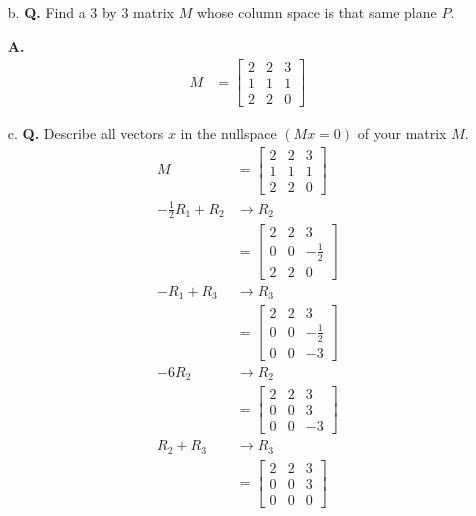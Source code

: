 \documentclass[main.tex]{subfiles}
\begin{document}
\begin{enumerate}
\begin{enumerate}
    \item [b.] \textbf{Q.} Find a 3 by 3 matrix $M$ whose column space is that same plane $P$. 
    
    \textbf{A.}
    $$
    \begin{aligned}
    M & = \left[\begin{array}{lll}
    2 & 2 & 3 \\
    1 & 1 & 1 \\
    2 & 2 & 0
    \end{array}\right]
    \end{aligned}
    $$
    
    \item [c.] \textbf{Q.} Describe all vectors $x$ in the nullspace $(M x=0)$ of your matrix $M$. 
    $$
    \begin{aligned}
    M & = \left[\begin{array}{lll}
    2 & 2 & 3 \\
    1 & 1 & 1 \\
    2 & 2 & 0
    \end{array}\right]\\
    -\frac{1}{2}R_1 + R_2 &\rightarrow R_2\\
    & = \left[\begin{array}{lll}
    2 & 2 & 3 \\
    0 & 0 & -\frac{1}{2} \\
    2 & 2 & 0
    \end{array}\right]\\
    -R_1 + R_3 &\rightarrow R_3\\
    & = \left[\begin{array}{lll}
    2 & 2 & 3 \\
    0 & 0 & -\frac{1}{2} \\
    0 & 0 & -3
    \end{array}\right]\\
    -6R_2 &\rightarrow R_2\\
    & = \left[\begin{array}{lll}
    2 & 2 & 3 \\
    0 & 0 & 3 \\
    0 & 0 & -3
    \end{array}\right]\\
    R_2 + R_3 &\rightarrow R_3\\
    & = \left[\begin{array}{lll}
    2 & 2 & 3 \\
    0 & 0 & 3 \\
    0 & 0 & 0
    \end{array}\right]\\

\end{aligned}$$
\end{enumerate}
\end{enumerate}
\end{document}
